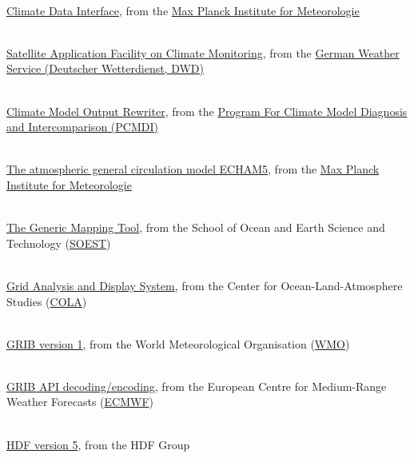 \begin{thebibliography}{xx}


 \ \\
  \href{https://code.zmaw.de/projects/cdi}
       {Climate Data Interface},
  from the
  \href{http://www.mpimet.mpg.de}
       {Max Planck Institute for Meteorologie}


 \ \\
  \href{http://www.cmsaf.eu}
       {Satellite Application Facility on Climate Monitoring},
  from the
  \href{http://www.dwd.de}
       {German Weather Service (Deutscher Wetterdienst, DWD)}


 \ \\
  \href{git://github.com/PCMDI/cmor.git}
       {Climate Model Output Rewriter},
  from the
  \href{https://www-pcmdi.llnl.gov}
       { Program For Climate Model Diagnosis and Intercomparison (PCMDI)}


 \ \\
  \href{http://www.mpimet.mpg.de/wissenschaft/publikationen/reports.html}
       {The atmospheric general circulation model ECHAM5},
  from the
  \href{http://www.mpimet.mpg.de}
       {Max Planck Institute for Meteorologie}


 \ \\
  \href{http://gmt.soest.hawaii.edu/gmt4/}
       {The Generic Mapping Tool},
  from the School of Ocean and Earth Science and Technology
  (\href{http://www.soest.hawaii.edu/}{SOEST})


 \ \\
  \href{http://www.iges.org/grads/}
       {Grid Analysis and Display System},
  from the Center for Ocean-Land-Atmosphere Studies
  (\href{http://www.iges.org/cola.html}{COLA})


 \ \\
  \href{http://www.wmo.ch/web/www/WMOCodes/Guides/GRIB/GRIB1-Contents.html}
       {GRIB version 1},
  from the World Meteorological Organisation
  (\href{http://www.wmo.ch}{WMO})


 \ \\
  \href{https://software.ecmwf.int/wiki/display/GRIB/Home}
       {GRIB API decoding/encoding},
  from the European Centre for Medium-Range Weather Forecasts
  (\href{http://www.ecmwf.int}{ECMWF})


 \ \\
  \href{https://www.hdfgroup.org/HDF5}
       {HDF version 5},
  from the HDF Group



\end{thebibliography}
